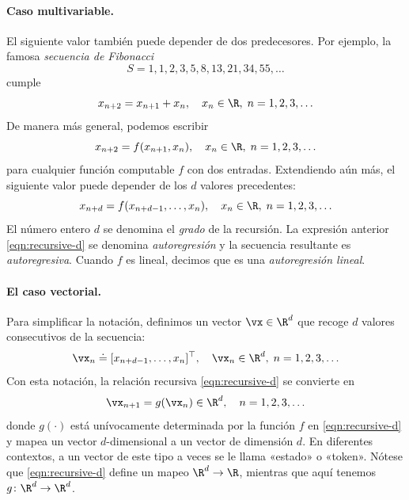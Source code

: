 \documentclass[../../book-main_es.tex]{subfiles}
\begin{document}
\paragraph{Caso multivariable.}
El siguiente valor también puede depender de dos predecesores. Por
ejemplo, la famosa \textit{secuencia de Fibonacci}
\begin{equation}
    S = 1, 1, 2, 3, 5, 8, 13, 21, 34, 55, \ldots
\end{equation}
cumple
\begin{equation}
    x_{n+2} = x_{n+1} + x_{n}, \quad x_{n} \in \R, \; n = 1, 2, 3, \ldots
\end{equation}
De manera más general, podemos escribir
\begin{equation}
    x_{n+2} = f(x_{n+1}, x_{n}), \quad x_{n} \in \R, \; n = 1, 2, 3, \ldots
\end{equation}
para cualquier función computable \(f\) con dos entradas. Extendiendo aún más,
el siguiente valor puede depender de los \(d\) valores precedentes:
\begin{equation}
    x_{n+d} = f(x_{n+d-1}, \ldots, x_{n}), \quad x_{n} \in \R, \; n =
    1, 2, 3, \ldots
    \label{eqn:recursive-d}
\end{equation}
El número entero \(d\) se denomina el \textit{grado} de la recursión. La
expresión anterior \eqref{eqn:recursive-d} se denomina 
\textit{autoregresión} y la secuencia resultante es
\textit{autoregresiva}. Cuando \(f\) es lineal, decimos que es una
\textit{autoregresión lineal}.

\paragraph{El caso vectorial.}
Para simplificar la notación, definimos un vector  \(\vx \in \R^{d}\) que
recoge \(d\) valores consecutivos de la secuencia:
\begin{equation}
    \vx_{n} \doteq [x_{n+d-1}, \ldots, x_{n}]^{\top}, \quad \vx_{n}
    \in \R^{d}, \; n = 1, 2, 3, \ldots
\end{equation}
Con esta notación, la relación recursiva \eqref{eqn:recursive-d} se convierte
en
\begin{equation}
    \vx_{n+1} = g(\vx_{n}) \in \R^{d}, \quad n = 1, 2, 3, \ldots
    \label{eqn:recursive-v}
\end{equation}
donde \(g(\cdot)\) está unívocamente determinada por la función \(f\) en
\eqref{eqn:recursive-d} y mapea un vector \(d\)-dimensional a un vector
de dimensión \(d\). En diferentes contextos, a un vector de este tipo a
veces se le llama «estado» o «token». Nótese que
\eqref{eqn:recursive-d} define un mapeo \(\R^{d} \to \R\), mientras que
aquí tenemos \(g \colon \R^{d} \to \R^{d}\).
\end{document}
